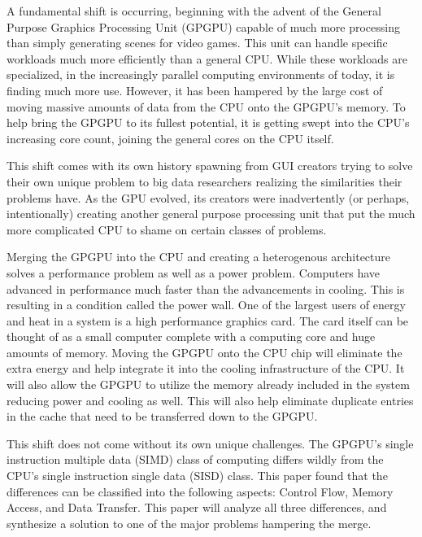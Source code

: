 A fundamental shift is occurring, beginning with the advent of the General Purpose Graphics Processing Unit (GPGPU) capable of much more processing than simply generating scenes for video games. This unit can handle specific workloads much more efficiently than a general CPU. While these workloads are specialized, in the increasingly parallel computing environments of today, it is finding much more use. However, it has been hampered by the large cost of moving massive amounts of data from the CPU onto the GPGPU's memory. To help bring the GPGPU to its fullest potential, it is getting swept into the CPU's increasing core count, joining the general cores on the CPU itself. 

This shift comes with its own history spawning from GUI creators trying to solve their own unique problem to big data researchers realizing the similarities their problems have. As the GPU evolved, its creators were inadvertently (or perhaps, intentionally) creating another general purpose processing unit that put the much more complicated CPU to shame on certain classes of problems. 

Merging the GPGPU into the CPU and creating a heterogenous architecture solves a performance problem as well as a power problem. Computers have advanced in performance much faster than the advancements in cooling. This is resulting in a condition called the power wall. One of the largest users of energy and heat in a system is a high performance graphics card. The card itself can be thought of as a small computer complete with a computing core and huge amounts of memory. Moving the GPGPU onto the CPU chip will eliminate the extra energy and help integrate it into the cooling infrastructure of the CPU. It will also allow the GPGPU to utilize the memory already included in the system reducing power and cooling as well. This will also help eliminate duplicate entries in the cache that need to be transferred down to the GPGPU.

This shift does not come without its own unique challenges. The GPGPU's single instruction multiple data (SIMD) class of computing differs wildly from the CPU's single instruction single data (SISD) class. This paper found that the differences can be classified into the following aspects: Control Flow, Memory Access, and Data Transfer. This paper will analyze all three differences, and synthesize a solution to one of the major problems hampering the merge.

